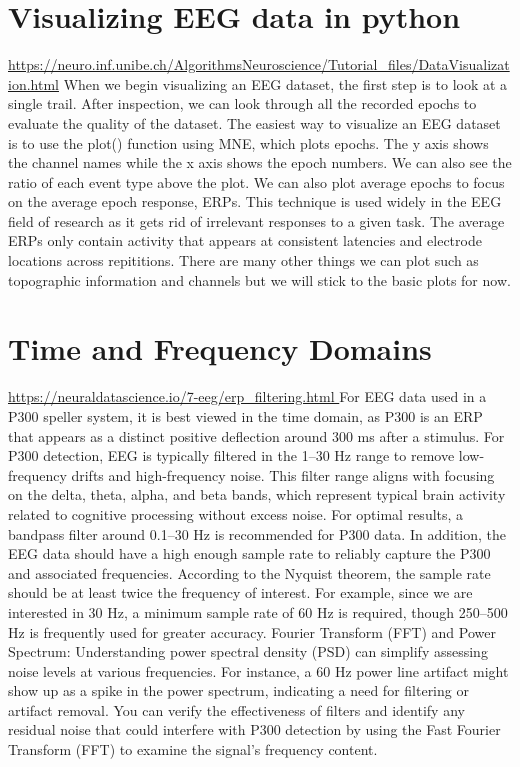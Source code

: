 \documentclass[12pt]{article}
\begin{document}
\section{Visualizing EEG data in python}
\url{https://neuro.inf.unibe.ch/AlgorithmsNeuroscience/Tutorial_files/DataVisualization.html}
When we begin visualizing an EEG dataset, the first step is to look at a single trail. After inspection, we can look through all the recorded epochs to evaluate the quality of the dataset. The easiest way to visualize an EEG dataset is to use the plot() function using MNE, which plots epochs. The y axis shows the channel names while the x axis shows the epoch numbers. We can also see the ratio of each event type above the plot. We can also plot average epochs to focus on the average epoch response, ERPs. This technique is used widely in the EEG field of research as it gets rid of irrelevant responses to a given task. The average ERPs only contain activity that appears at consistent latencies and electrode locations across repititions. There are many other things we can plot such as topographic information and channels but we will stick to the basic plots for now. 

\section{Time and Frequency Domains}
\url{https://neuraldatascience.io/7-eeg/erp_filtering.html }
For EEG data used in a P300 speller system, it is best viewed in the time domain, as P300 is an ERP that appears as a distinct positive deflection around 300 ms after a stimulus. For P300 detection, EEG is typically filtered in the 1–30 Hz range to remove low-frequency drifts and high-frequency noise. This filter range aligns with focusing on the delta, theta, alpha, and beta bands, which represent typical brain activity related to cognitive processing without excess noise. For optimal results, a bandpass filter around 0.1–30 Hz is recommended for P300 data. In addition, the EEG data should have a high enough sample rate to reliably capture the P300 and associated frequencies. According to the Nyquist theorem, the sample rate should be at least twice the frequency of interest. For example, since we are interested in 30 Hz, a minimum sample rate of 60 Hz is required, though 250–500 Hz is frequently used for greater accuracy. Fourier Transform (FFT) and Power Spectrum: Understanding power spectral density (PSD) can simplify assessing noise levels at various frequencies. For instance, a 60 Hz power line artifact might show up as a spike in the power spectrum, indicating a need for filtering or artifact removal. You can verify the effectiveness of filters and identify any residual noise that could interfere with P300 detection by using the Fast Fourier Transform (FFT) to examine the signal's frequency content.
\end{document}
